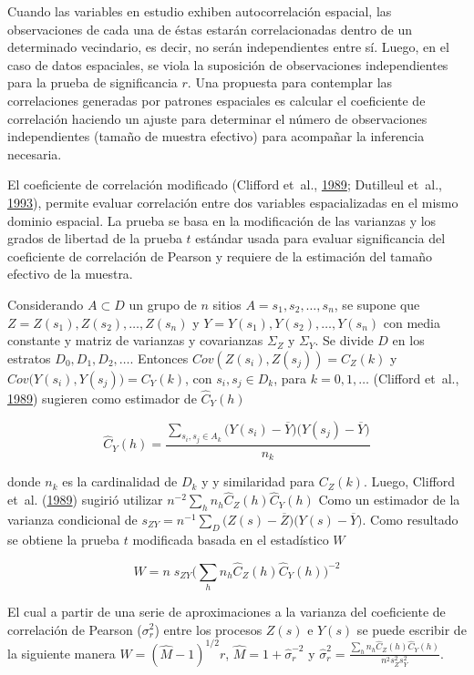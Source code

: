 \documentclass[11pt,b5paper,]{krantz}
\begin{document}
Cuando las variables en estudio exhiben autocorrelación espacial, las observaciones de cada una de éstas estarán correlacionadas dentro de un determinado vecindario, es decir, no serán independientes entre sí. Luego, en el caso de datos espaciales, se viola la suposición de observaciones independientes para la prueba de significancia \(r\). Una propuesta para contemplar las correlaciones generadas por patrones espaciales es calcular el coeficiente de correlación haciendo un ajuste para determinar el número de observaciones independientes (tamaño de muestra efectivo) para acompañar la inferencia necesaria.

El coeficiente de correlación modificado (Clifford et~al., \protect\hyperlink{ref-Clifford_Richardson_Hemon_1989}{1989}; Dutilleul et~al., \protect\hyperlink{ref-Dutilleul_Clifford_Richardson_Hemon_1993}{1993}), permite evaluar correlación entre dos variables espacializadas en el mismo dominio espacial. La prueba se basa en la modificación de las varianzas y los grados de libertad de la prueba \(t\) estándar usada para evaluar significancia del coeficiente de correlación de Pearson y requiere de la estimación del tamaño efectivo de la muestra.

Considerando \(A \subset D\) un grupo de \(n\) sitios \(A={s_1, s_2,…,s_n}\), se supone que \(Z=Z(s_1), Z(s_2),…, Z(s_n)\) y \(Y= Y(s_1), Y(s_2),…,Y(s_n)\) con media constante y matriz de varianzas y covarianzas \(\Sigma_Z\) y \(\Sigma_Y\). Se divide \(D\) en los estratos \(D_0, D_1, D_2,…\). Entonces \(Cov(Z(s_i),Z(s_j))= C_Z(k)\) y \(Cov\big(Y(s_i),Y(s_j)\big)= C_Y(k)\), con \(s_i, s_j \in D_k\), para \(k= 0,1,…\) (Clifford et~al., \protect\hyperlink{ref-Clifford_Richardson_Hemon_1989}{1989}) sugieren como estimador de \(\hat{C}_Y(h)\)

\[ \hat{C}_Y(h) = \frac{\sum_{s_i,s_j \in A_k}{\big( Y(s_i) - \overline{Y} \big) \big( Y(s_j) - \overline{Y} \big)}} {n_k} \]

donde \(n_k\) es la cardinalidad de \(D_k\) y y similaridad para \(C_Z(k)\). Luego, Clifford et~al. (\protect\hyperlink{ref-Clifford_Richardson_Hemon_1989}{1989}) sugirió utilizar \(n^{-2}\sum_h{n_h\hat{C}_Z(h) \hat{C}_Y(h)}\)
Como un estimador de la varianza condicional de \(s_{ZY}=n^{-1} \sum_D{ \big(Z(s)-\overline{Z} \big) \big(Y(s)-\overline{Y} \big) }\). Como resultado se obtiene la prueba \(t\) modificada basada en el estadístico \(W\)

\[W=n \; s_{ZY} \Big( \sum_h{n_h \hat{C}_Z(h) \hat{C}_Y(h)} \Big)^{-2}\]

El cual a partir de una serie de aproximaciones a la varianza del coeficiente de correlación de Pearson (\(\sigma_r^2\)) entre los procesos \(Z(s)\) e \(Y(s)\) se puede escribir de la siguiente manera \(W=(\hat{M}-1)^{1/2}r\), \(\hat{M} = 1 + {\hat{\sigma}}_r^{-2}\) y \(\hat{\sigma}_r^2 = \frac{\sum_h{n_h \hat{C}_Z(h) \hat{C}_Y(h)}} {n^2 s_Z^2 s_Y^2}\).
\end{document}
